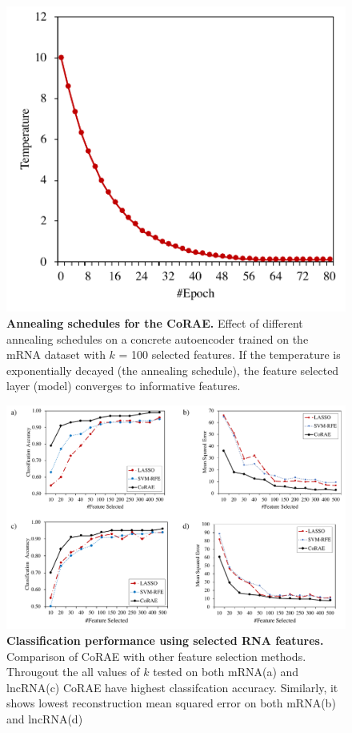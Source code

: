 \documentclass{bioinfo}
\begin{document}
{\begin{figure}[hbt]
    \centering
    \includegraphics[scale=0.5]{fig/temp-epoch-mRNA.pdf}
    \caption{\textbf{Annealing schedules for the CoRAE.} Effect of different annealing schedules on a
concrete autoencoder trained on the mRNA dataset with $k$ = 100
selected features. If
the temperature is exponentially decayed (the annealing schedule), the feature selected layer (model) converges to informative features.}
    \label{fig:temp}
\end{figure}
\begin{figure}[hbt]
    \centering
    \includegraphics[scale=0.5]{fig/acc-mse.pdf}
    \caption{\textbf{Classification performance using selected RNA features.}  Comparison of CoRAE with other feature selection methods. Througout the all values of $k$ tested on both mRNA(a) and lncRNA(c) CoRAE have highest classifcation accuracy. Similarly, it shows lowest reconstruction mean squared error on both mRNA(b) and lncRNA(d)}
    \label{fig:acc-mse}
\end{figure}
}
\end{document}

